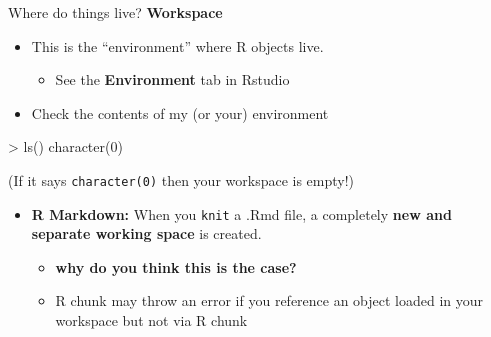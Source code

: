 \documentclass[
  ignorenonframetext,
]{beamer}
\newenvironment{Shaded}{\begin{snugshade}}{\end{snugshade}}
\newcommand{\DecValTok}[1]{\textcolor[rgb]{0.00,0.00,0.81}{#1}}
\newcommand{\FunctionTok}[1]{\textcolor[rgb]{0.00,0.00,0.00}{#1}}
\newcommand{\NormalTok}[1]{#1}
\newcommand{\SpecialCharTok}[1]{\textcolor[rgb]{0.00,0.00,0.00}{#1}}
\providecommand{\tightlist}{%
  \setlength{\itemsep}{0pt}\setlength{\parskip}{0pt}}
\begin{document}
\begin{frame}[fragile]{Where do things live? \textbar{}
\textbf{Workspace}}
\protect\hypertarget{where-do-things-live-workspace}{}
\begin{itemize}[<+->]
\tightlist
\item
  This is the ``environment'' where R objects live.

  \begin{itemize}[<+->]
  \tightlist
  \item
    See the \textbf{Environment} tab in Rstudio
  \end{itemize}
\item
  Check the contents of my (or your) environment
\end{itemize}

\begin{Shaded}
\begin{Highlighting}[]
\SpecialCharTok{\textgreater{}} \FunctionTok{ls}\NormalTok{()}
\FunctionTok{character}\NormalTok{(}\DecValTok{0}\NormalTok{)}
\end{Highlighting}
\end{Shaded}

(If it says \texttt{character(0)} then your workspace is empty!)

\begin{itemize}[<+->]
\tightlist
\item
  \textbf{R Markdown:} When you \texttt{knit} a .Rmd file, a completely
  \textbf{new and separate working space} is created.

  \begin{itemize}[<+->]
  \tightlist
  \item
    \textbf{why do you think this is the case?}
  \item
    R chunk may throw an error if you reference an object loaded in your
    workspace but not via R chunk
  \end{itemize}
\end{itemize}
\end{frame}
\end{document}
